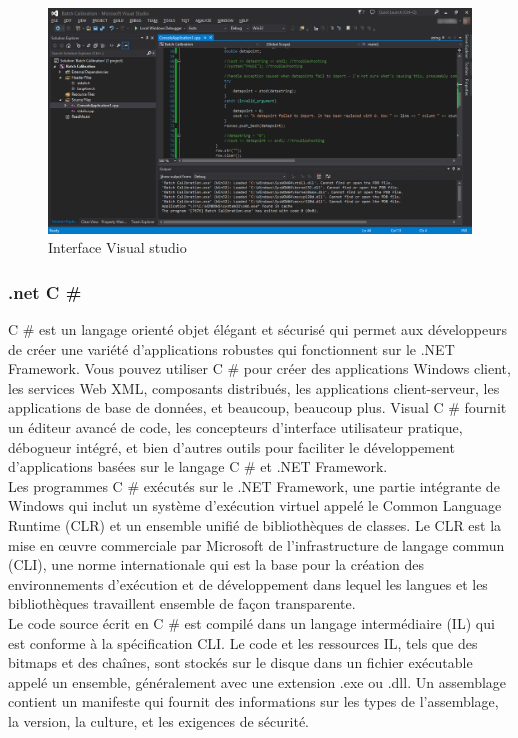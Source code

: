 \documentclass[11pt, a4paper, twoside]{book}
\begin{document}
\begin{figure}[H]
\centering
\includegraphics[width=\textwidth]{vs}
\caption{Interface Visual studio }
\end{figure}

\subsubsection{.net C \#}
C \# est un langage orienté objet élégant et sécurisé qui permet aux développeurs de créer une variété d'applications robustes qui fonctionnent sur le .NET Framework. Vous pouvez utiliser C \# pour créer des applications Windows client, les services Web XML, composants distribués, les applications client-serveur, les applications de base de données, et beaucoup, beaucoup plus. Visual C \# fournit un éditeur avancé de code, les concepteurs d'interface utilisateur pratique, débogueur intégré, et bien d'autres outils pour faciliter le développement d'applications basées sur le langage C \# et .NET Framework.\\

Les programmes C \# exécutés sur le .NET Framework, une partie intégrante de Windows qui inclut un système d'exécution virtuel appelé le Common Language Runtime (CLR) et un ensemble unifié de bibliothèques de classes. Le CLR est la mise en œuvre commerciale par Microsoft de l'infrastructure de langage commun (CLI), une norme internationale qui est la base pour la création des
environnements d'exécution et de développement dans lequel les langues et les bibliothèques travaillent ensemble de façon transparente.\\

Le code source écrit en C \# est compilé dans un langage intermédiaire (IL) qui est conforme à la spécification CLI. Le code et les ressources IL, tels que des bitmaps et des chaînes, sont stockés sur le disque dans un fichier exécutable appelé un ensemble, généralement avec une extension .exe ou .dll. Un assemblage contient un manifeste qui fournit des informations sur les types de l'assemblage, la version, la culture, et les exigences de sécurité.\\
\end{document}
